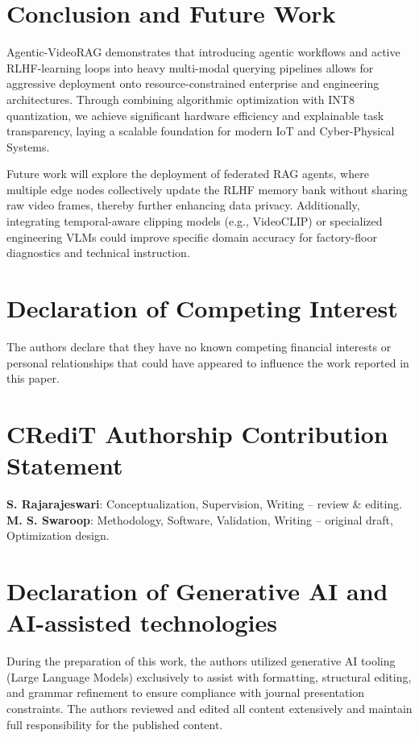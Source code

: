 \documentclass[preprint,12pt]{elsarticle}
\begin{document}
\section{Conclusion and Future Work}
Agentic-VideoRAG demonstrates that introducing agentic workflows and active RLHF-learning loops into heavy multi-modal querying pipelines allows for aggressive deployment onto resource-constrained enterprise and engineering architectures. Through combining algorithmic optimization with INT8 quantization, we achieve significant hardware efficiency and explainable task transparency, laying a scalable foundation for modern IoT and Cyber-Physical Systems.

Future work will explore the deployment of federated RAG agents, where multiple edge nodes collectively update the RLHF memory bank without sharing raw video frames, thereby further enhancing data privacy. Additionally, integrating temporal-aware clipping models (e.g., VideoCLIP) or specialized engineering VLMs could improve specific domain accuracy for factory-floor diagnostics and technical instruction.

\section*{Declaration of Competing Interest}
The authors declare that they have no known competing financial interests or personal relationships that could have appeared to influence the work reported in this paper.

\section*{CRediT Authorship Contribution Statement}
\textbf{S. Rajarajeswari}: Conceptualization, Supervision, Writing – review \& editing. \textbf{M. S. Swaroop}: Methodology, Software, Validation, Writing – original draft, Optimization design. 

\section*{Declaration of Generative AI and AI-assisted technologies}
During the preparation of this work, the authors utilized generative AI tooling (Large Language Models) exclusively to assist with formatting, structural editing, and grammar refinement to ensure compliance with journal presentation constraints. The authors reviewed and edited all content extensively and maintain full responsibility for the published content. 
\end{document}
